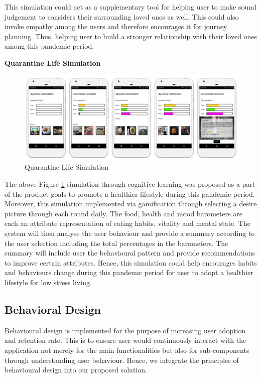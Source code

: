      \par This simulation could act as a supplementary tool for helping user to make sound judgement to considers their surrounding loved ones as well. This could also invoke empathy among the users and therefore encourages it for journey planning. Thus, helping user to build a stronger relationship with their loved ones among this pandemic period.
      
      \vspace{0.5cm}
      \par \textbf{Quarantine Life Simulation}
      \vspace{0.5cm}
      \begin{figure}[H]
        \centering
        \includegraphics[scale=1]{img/digital-prototype/quarantine-life.png}
        \caption{Quarantine Life Simulation}
        \label{fig:digi-proto-02}
      \end{figure}
      \par The above Figure \ref{fig:digi-proto-02} simulation through cognitive learning was proposed as a part of the product goals to promote a healthier lifestyle during this pandemic period. Moreover, this simulation implemented via gamification through selecting a desire picture through each round daily. The food, health and mood barometers are each an attribute representation of eating habits, vitality and mental state. The system will then analyse the user behaviour and provide a summary according to the user selection including the total percentages in the barometers. The summary will include user the behavioural pattern and provide recommendations to improve certain attributes. Hence, this simulation could help encourages habits and behaviours change during this pandemic period for user to adopt a healthier lifestyle for low stress living.

  \subsection{Behavioral Design}
    \par Behavioural design is implemented for the purpose of increasing user adoption and retention rate. This is to ensure user would continuously interact with the application not merely for the main functionalities but also for sub-components through understanding user behaviour. Hence, we integrate the principles of behavioural design into our proposed solution.

